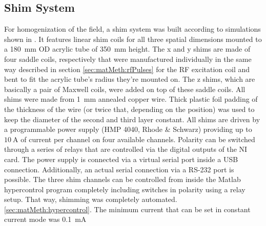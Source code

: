         \subsection{Shim System}
        \label{sec:matMeth:shims}
        For homogenization of the field, a shim system was built according to simulations shown in \cite{littin_monoplanar_2015}. It features linear shim coils for all three spatial dimensions mounted to a \SI{180}{\mm} OD acrylic tube of \SI{350}{\mm} height. The x and y shims are made of four saddle coils, respectively that were manufactured individually in the same way described in section \ref{sec:matMeth:rfPulses} for the RF excitation coil and bent to fit the acrylic tube's radius they're mounted on. The z shims, which are basically a pair of Maxwell coils, were added on top of these saddle coils. All shims were made from \SI{1}{\mm} annealed copper wire. Thick plastic foil padding of the thickness of the wire (or twice that, depending on the position) was used to keep the diameter of the second and third layer constant. All shims are driven by a  programmable power supply (HMP 4040, Rhode \& Schwarz) providing up to $\SI{10}{\ampere}$ of current per channel on four available channels. Polarity can be switched through a series of relays that are controlled via the digital outputs of the NI card. The power supply is connected via a virtual serial port inside a USB connection. Additionally, an actual serial connection via a RS-232 port is possible. The three shim channels can be controlled from inside the Matlab hypercontrol program completely including switches in polarity using a relay setup. That way, shimming was completely automated. \ref{sec:matMeth:hypercontrol}.
        The minimum current that can be set in constant current mode was \SI{0.1}{\milli\ampere}
